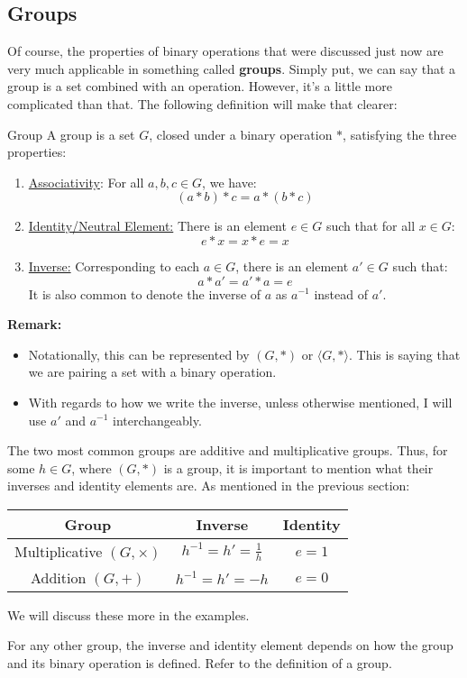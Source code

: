 \documentclass[letterpaper]{article}
\begin{document}
\subsection{Groups}
Of course, the properties of binary operations that were discussed just now are very much applicable in something called \textbf{groups}. Simply put, we can say that a group is a set combined with an operation. However, it's a little more complicated than that. The following definition will make that clearer:
\begin{definition}{Group}{}
    A group is a set $G$, closed under a binary operation $*$, satisfying the three properties:
    \begin{enumerate}
        \item \underline{Associativity}: For all $a, b, c \in G$, we have:
        \[(a * b) * c = a * (b * c)\]

        \item \underline{Identity/Neutral Element:} There is an element $e \in G$ such that for all $x \in G$:
        \[e * x = x * e = x\]

        \item \underline{Inverse:} Corresponding to each $a \in G$, there is an element $a' \in G$ such that:
        \[a * a' = a' * a = e\]
        It is also common to denote the inverse of $a$ as $a^{-1}$ instead of $a'$.
    \end{enumerate}
\end{definition}
\textbf{Remark:}
\begin{itemize}
    \item Notationally, this can be represented by $(G, *)$ or $\langle G, * \rangle$. This is saying that we are pairing a set with a binary operation. 
    \item With regards to how we write the inverse, unless otherwise mentioned, I will use $a'$ and $a^{-1}$ interchangeably.
\end{itemize}

\begin{note*}{}{}
    The two most common groups are additive and multiplicative groups. Thus, for some $h \in G$, where $(G, *)$ is a group, it is important to mention what their inverses and identity elements are. As mentioned in the previous section:
    \begin{center}
        \begin{tabular}{|c|c|c|}
            \hline 
            \textbf{Group} & \textbf{Inverse} & \textbf{Identity} \\ 
            \hline 
            Multiplicative $(G, \times)$ & $h^{-1} = h' = \frac{1}{h}$ & $e = 1$ \\ 
            Addition $(G, +)$ & $h^{-1} = h' = -h$ & $e = 0$ \\ 
            \hline 
        \end{tabular}
    \end{center}
    We will discuss these more in the examples. 

    \bigskip 

    For any other group, the inverse and identity element depends on how the group and its binary operation is defined. Refer to the definition of a group.
\end{note*}
\end{document}
